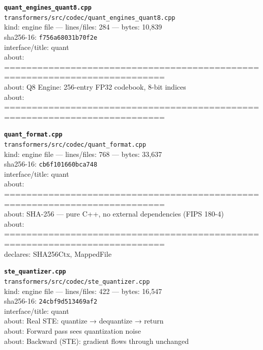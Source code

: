 \noindent\textbf{\texttt{quant\_engines\_quant8.cpp}}\\
\texttt{transformers/src/codec/quant\_engines\_quant8.cpp}\\
kind: engine file --- lines/files: 284 --- bytes: 10,839\\
sha256-16: \texttt{f756a68031b70f2e}\\
interface/title: quant\\
about: ===========================================================================\\
about: Q8 Engine: 256-entry FP32 codebook, 8-bit indices\\
about: ===========================================================================\\
\vspace*{6.0pt}
\newpage

\noindent\textbf{\texttt{quant\_format.cpp}}\\
\texttt{transformers/src/codec/quant\_format.cpp}\\
kind: engine file --- lines/files: 768 --- bytes: 33,637\\
sha256-16: \texttt{cb6f101660bca748}\\
interface/title: quant\\
about: ===========================================================================\\
about: SHA-256 — pure C++, no external dependencies (FIPS 180-4)\\
about: ===========================================================================\\
declares: SHA256Ctx, MappedFile\\
\vspace*{6.0pt}

\noindent\textbf{\texttt{ste\_quantizer.cpp}}\\
\texttt{transformers/src/codec/ste\_quantizer.cpp}\\
kind: engine file --- lines/files: 422 --- bytes: 16,547\\
sha256-16: \texttt{24cbf9d513469af2}\\
interface/title: quant\\
about: Real STE: quantize → dequantize → return\\
about: Forward pass sees quantization noise\\
about: Backward (STE): gradient flows through unchanged\\
\vspace*{6.0pt}

